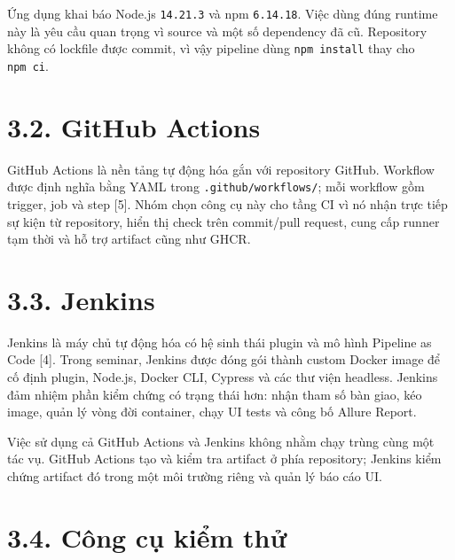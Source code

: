 \documentclass[
  vietnamese,
  12pt,
  a4paper,
  oneside]{report}
\begin{document}
Ứng dụng khai báo Node.js \texttt{14.21.3} và npm \texttt{6.14.18}. Việc
dùng đúng runtime này là yêu cầu quan trọng vì source và một số
dependency đã cũ. Repository không có lockfile được commit, vì vậy
pipeline dùng \texttt{npm\ install} thay cho \texttt{npm\ ci}.

\section{3.2. GitHub Actions}\label{32-github-actions}

GitHub Actions là nền tảng tự động hóa gắn với repository GitHub.
Workflow được định nghĩa bằng YAML trong \texttt{.github/workflows/};
mỗi workflow gồm trigger, job và step {[}5{]}. Nhóm chọn công cụ này cho
tầng CI vì nó nhận trực tiếp sự kiện từ repository, hiển thị check trên
commit/pull request, cung cấp runner tạm thời và hỗ trợ artifact cũng
như GHCR.

\section{3.3. Jenkins}\label{33-jenkins}

Jenkins là máy chủ tự động hóa có hệ sinh thái plugin và mô hình
Pipeline as Code {[}4{]}. Trong seminar, Jenkins được đóng gói thành
custom Docker image để cố định plugin, Node.js, Docker CLI, Cypress và
các thư viện headless. Jenkins đảm nhiệm phần kiểm chứng có trạng thái
hơn: nhận tham số bàn giao, kéo image, quản lý vòng đời container, chạy
UI tests và công bố Allure Report.

Việc sử dụng cả GitHub Actions và Jenkins không nhằm chạy trùng cùng một
tác vụ. GitHub Actions tạo và kiểm tra artifact ở phía repository;
Jenkins kiểm chứng artifact đó trong một môi trường riêng và quản lý báo
cáo UI.

\section{3.4. Công cụ kiểm
thử}\label{34-cuxf4ng-cux1ee5-kiux1ec3m-thux1eed}
\end{document}

